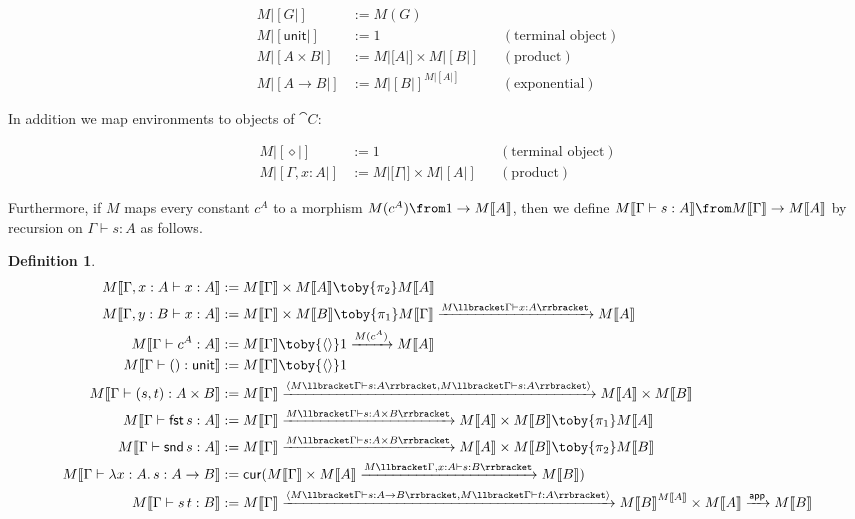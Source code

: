 \documentclass{article}
\newtheorem{defn}{Definition}[section]
\newcommand{\type}{\vdash}
\newcommand{\term}{1}
\newcommand{\unit}{\mathsf{unit}}
\newcommand{\app}{\mathsf{app}}
\newcommand{\cur}{\mathsf{cur}}
\newcommand{\fst}{\mathsf{fst}\,}
\newcommand{\snd}{\mathsf{snd}\,}
\newcommand{\eenv}{\diamond}
\begin{document}
\begin{align*}
    M|[G|] & := M(G) \\
    M|[\unit|] & := \term && (\text{terminal object}) \\
    M|[A \times B |] & := M|[A|] \times M|[B|] && (\text{product}) \\
    M|[A \to B |] & := M|[B|]^{M|[A|]} && (\text{exponential})
\end{align*}

In addition we map environments to objects of $\cat{C}$:

\begin{align*}
    M|[\eenv|] & := \term && (\text{terminal object}) \\
    M|[\Gamma, x: A|] & := M|[\Gamma|] \times M|[A|] && (\text{product})
\end{align*}

Furthermore, if $M$ maps every constant $c^A$ to a morphism $M(c^A) \from \term \to M|[A|]$,
then we define $M|[\Gamma \type s: A|] \from M|[\Gamma|] \to M|[A|]$ by recursion on $\Gamma \type s: A$ as follows.

\begin{defn}
    \label{def:type-C}
    \begin{align*}
        M|[\Gamma, x: A \type x: A|] & := M|[\Gamma|] \times M|[A|] \toby{\pi_2} M|[A|] \\
        M|[\Gamma, y: B \type x: A|] & := M|[\Gamma|] \times M|[B|] \toby{\pi_1} M|[\Gamma|] \xrightarrow{M\llbracket\Gamma \type x: A\rrbracket} M|[A|] \\
        M|[\Gamma \type c^A: A|] & := M|[\Gamma|] \toby{\langle\rangle} \term \xrightarrow{M(c^A)} M|[A|] \\
        M|[\Gamma \type (): \unit|] & := M|[\Gamma|] \toby{\langle\rangle} \term \\
        M|[\Gamma \type (s, t): A \times B|] & := M|[\Gamma|]
        \xrightarrow{\langle M\llbracket\Gamma \type s: A\rrbracket, M\llbracket\Gamma \type s: A\rrbracket\rangle} M|[A|] \times M|[B|] \\
        M|[\Gamma \type \fst s: A|] & := M|[\Gamma|] \xrightarrow{M\llbracket\Gamma \type s: A \times B\rrbracket} M|[A|] \times M|[B|] \toby{\pi_1} M|[A|] \\
        M|[\Gamma \type \snd s: A|] & := M|[\Gamma|] \xrightarrow{M\llbracket\Gamma \type s: A \times B\rrbracket} M|[A|] \times M|[B|] \toby{\pi_2} M|[B|] \\
        M|[\Gamma \type \lambda x: A.\, s: A \to B|] & := \cur(M|[\Gamma|] \times M|[A|] \xrightarrow{M\llbracket\Gamma, x: A \type s : B\rrbracket} M|[B|]) \\
        M|[\Gamma \type s\,t: B|] & := M|[\Gamma|]
        \xrightarrow{\langle M\llbracket\Gamma \type s: A \to B\rrbracket, M\llbracket\Gamma \type t: A\rrbracket\rangle}
        M|[B|]^{M|[A|]} \times M|[A|] \xrightarrow{\app} M|[B|]
    \end{align*}
\end{defn}
\end{document}
